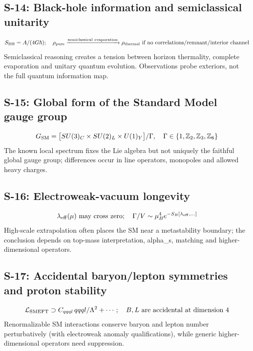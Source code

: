 \subsection*{S-14: Black-hole information and semiclassical unitarity}
\begingroup\small
\begin{equation*}
S_{\rm BH}=A/(4G\hbar);\allowbreak\quad \rho_{\rm pure}\xrightarrow{\rm semiclassical\ evaporation}\rho_{\rm thermal}\ \text{if no correlations/remnant/interior channel}
\end{equation*}
\endgroup
Semiclassical reasoning creates a tension between horizon thermality, complete evaporation and unitary quantum evolution. Observations probe exteriors, not the full quantum information map.
\subsection*{S-15: Global form of the Standard Model gauge group}
\begingroup\small
\begin{equation*}
G_{\rm SM}=\big[SU(3)_C\times SU(2)_L\times U(1)_Y\big]/\Gamma,\quad \Gamma\in\{1,\mathbb Z_2,\mathbb Z_3,\mathbb Z_6\}
\end{equation*}
\endgroup
The known local spectrum fixes the Lie algebra but not uniquely the faithful global gauge group; differences occur in line operators, monopoles and allowed heavy charges.
\subsection*{S-16: Electroweak-vacuum longevity}
\begingroup\small
\begin{equation*}
\lambda_{\rm eff}(\mu)\ \text{may cross zero};\allowbreak\quad \Gamma/V\sim \mu_B^4e^{-S_B[\lambda_{\rm eff},\ldots]}
\end{equation*}
\endgroup
High-scale extrapolation often places the SM near a metastability boundary; the conclusion depends on top-mass interpretation, alpha\_s, matching and higher-dimensional operators.
\subsection*{S-17: Accidental baryon/lepton symmetries and proton stability}
\begingroup\small
\begin{equation*}
\mathcal L_{\rm SMEFT}\supset C_{qqql}\,qqql/\Lambda^2+\cdots;\allowbreak\quad B,L\ \text{are accidental at dimension }4
\end{equation*}
\endgroup
Renormalizable SM interactions conserve baryon and lepton number perturbatively (with electroweak anomaly qualifications), while generic higher-dimensional operators need suppression.
